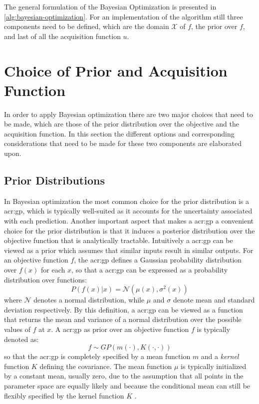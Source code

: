 The general formulation of the Bayesian Optimization is presented in \autoref{alg:bayesian-optimization}.
For an implementation of the algorithm still three components need to be defined, which are the domain $\mathcal{X}$ of $f$, the prior over $f$, and last of all the acquisition function $u$.

\section{Choice of Prior and Acquisition Function}
\label{sec:bayesian-optimization-prior-acquisition}
In order to apply Bayesian optimization there are two major choices that need to be made, which are those of the prior distribution over the objective and the acquisition function. In this section the different options and corresponding considerations that need to be made for these two components are elaborated upon.

\subsection*{Prior Distributions}
\label{sec:bayesian-optimization-prior}
In Bayesian optimization the most common choice for the prior distribution is a \acrfull{acr:gp}, which is typically well-suited as it accounts for the uncertainty associated with each prediction.
Another important aspect that makes a \acrshort{acr:gp} a convenient choice for the prior distribution is that it induces a posterior distribution over the objective function that is analytically tractable.
Intuitively a \acrshort{acr:gp} can be viewed as a prior which assumes that similar inputs result in similar outputs.
For an objective function $f$, the \acrshort{acr:gp} defines a Gaussian probability distribution over $f(x)$ for each $x$, so that a \acrshort{acr:gp} can be expressed as a probability distribution over functions:
\begin{equation}
	P(f(x) \vert x) = \mathcal{N}(\mu(x), \sigma^2(x))
\end{equation}
where $\mathcal{N}$ denotes a normal distribution, while $\mu$ and $\sigma$ denote mean and standard deviation respectively.
By this definition, a \acrshort{acr:gp} can be viewed as a function that returns the mean and variance of a normal distribution over the possible values of $f$ at $x$. A \acrshort{acr:gp} as prior over an objective function $f$ is typically denoted as: 
\begin{equation}
\label{eq:gp}
f \sim GP(m(\cdot), K(\cdot, \cdot))
\end{equation}
so that the \acrshort{acr:gp} is completely specified by a mean function $m$ and a \textit{kernel} function $K$ defining the covariance.
The mean function $\mu$ is typically initialized by a constant mean, usually zero, due to the assumption that all points in the parameter space are equally likely and because the conditional mean can still be flexibly specified by the kernel function $K$ \cite{kawaguchi2015bayesian}.

